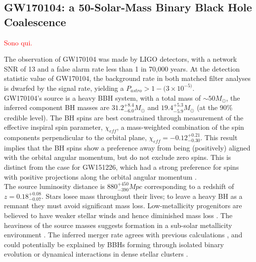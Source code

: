 \documentclass[binding=0.6cm, LaM]{sapthesis}
\newcommand{\fpg}[1]{\textcolor{red}{#1} }
\begin{document}
\subsection{GW170104: a 50-Solar-Mass Binary Black Hole Coalescence}

\fpg{Sono qui.}

	The observation of GW170104 was made by LIGO detectors, 
	with a network SNR of 13 and a false alarm rate less than 1 in 70,000 years.
	At the detection statistic value of GW170104, the background rate in both matched filter 
	analyses is dwarfed by the signal rate, yielding a $P_{astro} > 1 - (3 \times 10^{-5)}$. \\
	GW170104’s source is a heavy BBH system, with a total mass of $\sim50M_\odot$,	
	the inferred component BH masses are $31.2^{+8.4}_{-6.0}M_\odot$ and $19.4^{+5.3} _{-5.9}M_\odot$ (at the 90\% credible level). 
	The BH spins are best constrained through measurement of the effective inspiral spin parameter, $\chi_{eff}$, 
	a mass-weighted combination of the spin components perpendicular to the orbital plane, $\chi_{eff} = −0.12^{+0.21}_{−0.30}$. 
	This result implies that the BH spins show a preference away from being 
	(positively) aligned with the orbital angular momentum, but do not exclude zero spins. 
	This is distinct from the case for GW151226, which had a strong preference 
	for spins with positive projections along the orbital angular momentum \cite{58}. \\
	The source luminosity distance is $880^{+450}_{−390} Mpc$ corresponding to a redshift of $z = 0.18^{+0.08}_{−0.07}$. 
	Stars losee mass throughout their lives; to leave a heavy BH as a remnant 
	they must avoid significant mass loss. 
	Low-metallicity progenitors are believed to have weaker stellar winds and hence diminished mass loss \cite{135}. 
	The heaviness of the source masses suggests formation in a sub-solar metallicity environment \cite{134}. 
	The inferred merger rate agrees with previous calculations \cite{59, 137}, and could potentially be explained 	
	by BBHs forming through isolated binary evolution or dynamical interactions in dense stellar clusters \cite{134}. 
\end{document}
